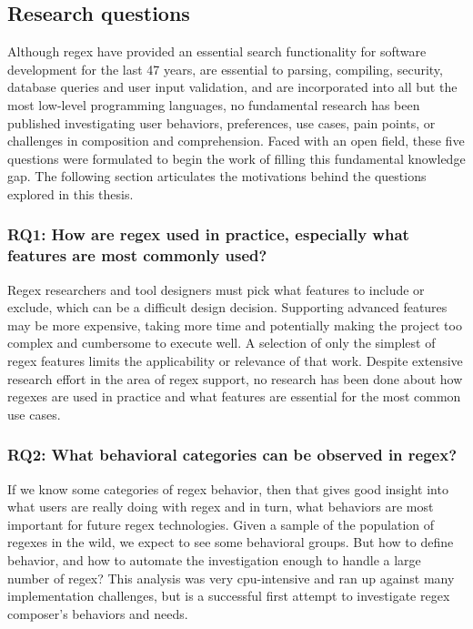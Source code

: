 \subsection{Research questions}

Although regex have provided an essential search functionality for software development for the last 47 years, are essential to parsing, compiling, security, database queries and user input validation, and are incorporated into all but the most low-level programming languages, no fundamental research has been published investigating user behaviors, preferences, use cases, pain points, or challenges in composition and comprehension.  Faced with an open field, these five questions were formulated to begin the work of filling this fundamental knowledge gap.  The following section articulates the motivations behind the questions explored in this thesis.

\subsubsection{RQ1: How are regex used in practice, especially what features are most commonly used?}

Regex researchers and tool designers must pick what features to include or exclude, which  can be a difficult  design decision. Supporting advanced features may be more expensive, taking more time and potentially making the project too complex and cumbersome to execute well.  A selection of only the simplest of regex features limits the applicability or relevance of that work. Despite extensive research effort in the area of regex support,  no research has been done about how regexes are used in practice and what features are essential for the most common use cases.

\subsubsection{RQ2: What behavioral categories can be observed in regex?}
If we know some categories of regex behavior, then that gives good insight into what users are really doing with regex and in turn, what behaviors are most important for future regex technologies.  Given a sample of the population of regexes in the wild, we expect to see some behavioral groups.  But how to define behavior, and how to automate the investigation enough to handle a large number of regex?  This analysis was very cpu-intensive and ran up against many implementation challenges, but is a successful first attempt to investigate regex composer's behaviors and needs.

